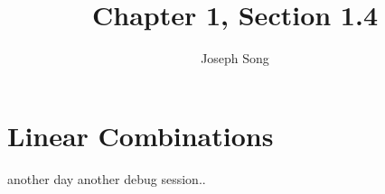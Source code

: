 \documentclass{article}
\title{Chapter 1, Section 1.4}
\author{Joseph Song}
\date{}
\begin{document}
 
\maketitle

\section{Linear Combinations}
another day another debug session..
 
\end{document}
